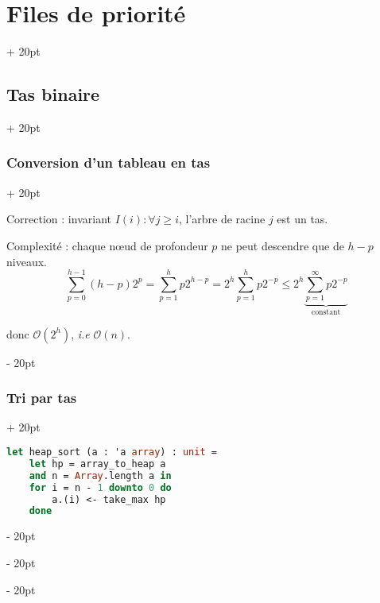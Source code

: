 \documentclass[a4paper, 12pt, twoside]{article}
\renewcommand{\le}{\leqslant}
\renewcommand{\ge}{\geqslant}
\newcommand{\ind}[1][20pt]{\advance\leftskip + #1}
\newcommand{\deind}[1][20pt]{\advance\leftskip - #1}
\newenvironment{indt}[2][20pt]{#2 \par \ind[#1]}{\par \deind} %
\begin{document}
\begin{indt}{\section{Files de priorité}}
\begin{indt}{\subsection{Tas binaire}}
\begin{indt}{\subsubsection{Conversion d'un tableau en tas}}
                \begin{center}
                \end{center}
                
                \vspace{12pt}
                
                Correction : invariant $I(i) : \forall j \ge i$, l'arbre de racine $j$ est un tas.
                
                Complexité : chaque n\oe ud de profondeur $p$ ne peut descendre que de $h - p$ niveaux.
                    \[ \sum_{p = 0}^{h - 1} (h - p) 2^p = \sum_{p = 1}^h p 2^{h - p} = 2^h \sum_{p = 1}^h p 2^{-p} \le 2^h \underbrace{\sum_{p = 1}^\infty p 2^{-p}}_{\text{constant}} \]
                
                donc $\mathcal O(2^h)$, \textit{i.e} $\mathcal O(n)$.
            \end{indt}
            
            \vspace{12pt}
            
            \begin{indt}{\subsubsection{Tri par tas}}
                \begin{lstlisting}[language=Caml, xleftmargin=80pt]
let heap_sort (a : 'a array) : unit =
    let hp = array_to_heap a
    and n = Array.length a in
    for i = n - 1 downto 0 do
        a.(i) <- take_max hp
    done\end{lstlisting}
                

\end{indt}
\end{indt}
\end{indt}
\end{document}
